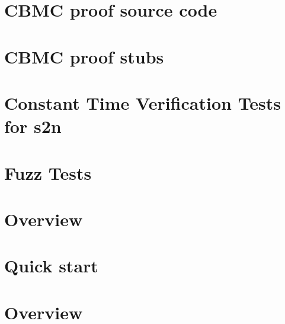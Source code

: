 \documentclass[twoside]{book}
\newcommand{\+}{\discretionary{\mbox{\scriptsize$\hookleftarrow$}}{}{}}
\begin{document}
\chapter{CBMC proof source code}
\label{md_crt_aws_crt_cpp_crt_s2n_tests_cbmc_templates_template_for_repository_sources__r_e_a_d_m_e}

\chapter{CBMC proof stubs}
\label{md_crt_aws_crt_cpp_crt_s2n_tests_cbmc_templates_template_for_repository_stubs__r_e_a_d_m_e}

\chapter{Constant Time Verification Tests for s2n}
\label{md_crt_aws_crt_cpp_crt_s2n_tests_ctverif__r_e_a_d_m_e}

\chapter{Fuzz Tests}
\label{md_crt_aws_crt_cpp_crt_s2n_tests_fuzz__readme}

\chapter{Overview}
\label{md_crt_aws_crt_cpp_crt_s2n_tests_integration_trust_store__r_e_a_d_m_e}

\chapter{Quick start}
\label{md_crt_aws_crt_cpp_crt_s2n_tests_integrationv2__r_e_a_d_m_e}

\chapter{Overview}
\label{md_crt_aws_crt_cpp_crt_s2n_tests_pems_ocsp__o_c_s_p__t_e_s_t}

\end{document}
